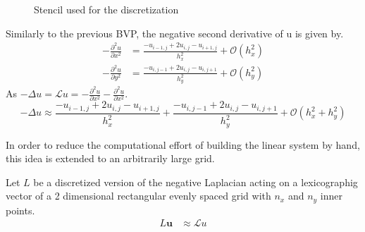 \documentclass{article}
\begin{document}
\begin{figure}[H]
	\centering
	\caption{Stencil used for the discretization}
\end{figure}
Similarly to the previous BVP, the negative second derivative of u is given by.
\begin{align}
	-\frac{\partial^2 u}{\partial x^2} &= \frac{-u_{i-1,j}+2u_{i,j}-u_{i+1,j}}{h_x^2} + \mathcal{O}(h_x^2)\\
	-\frac{\partial^2 u}{\partial y^2} &= \frac{-u_{i,j-1}+2u_{i,j}-u_{i,j+1}}{h_y^2} + \mathcal{O}(h_y^2)
\end{align}
As $-\Delta u=\mathcal{L}u = -\frac{\partial^2u}{\partial x^2} - \frac{\partial^2u}{\partial x^2}$.
\begin{equation}
	-\Delta u \approx \frac{-u_{i-1,j}+2u_{i,j}-u_{i+1,j}}{h_x^2} + \frac{-u_{i,j-1}+2u_{i,j}-u_{i,j+1}}{h_y^2}+\mathcal{O}(h_x^2+h_y^2)
\end{equation}

In order to reduce the computational effort of building the linear system by hand, this idea is extended to an arbitrarily large grid.

Let $L$ be a discretized version of the negative Laplacian acting on a lexicographig vector of a 2 dimensional rectangular evenly spaced grid with $n_x$ and $n_y$ inner points.
\begin{align}
    L\mathbf{u} &\approx \mathcal{L} u\\
\end{align}
\end{document}
